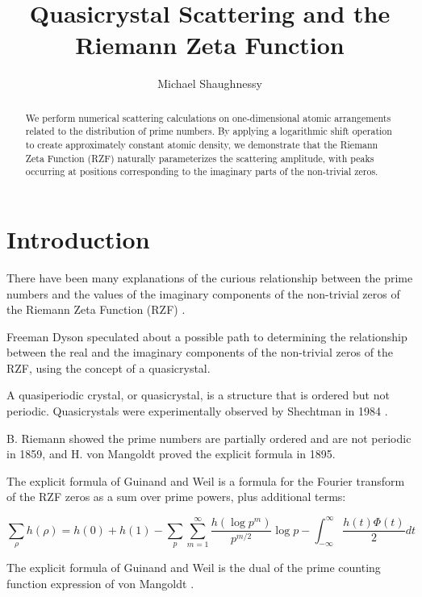 \documentclass[11pt, oneside]{article}
\title{Quasicrystal Scattering and the Riemann Zeta Function}
\author{Michael Shaughnessy}
\begin{document}
\maketitle

\begin{abstract}
We perform numerical scattering calculations on one-dimensional atomic arrangements related to the distribution of prime numbers. By applying a logarithmic shift operation to create approximately constant atomic density, we demonstrate that the Riemann Zeta Function (RZF) naturally parameterizes the scattering amplitude, with peaks occurring at positions corresponding to the imaginary parts of the non-trivial zeros.
\end{abstract}

\section{Introduction}

There have been many explanations of the curious relationship between the prime numbers and the values of the imaginary components of the non-trivial zeros of the Riemann Zeta Function (RZF) \cite{Riemann1859, Selberg1956, Dyson2009, Zhang2014}.

Freeman Dyson \cite{Baez2013} speculated about a possible path to determining the relationship between the real and the imaginary components of the non-trivial zeros of the RZF, using the concept of a quasicrystal.

A quasiperiodic crystal, or quasicrystal, is a structure that is ordered but not periodic. Quasicrystals were experimentally observed by Shechtman in 1984 \cite{Shectman1984}. 

B. Riemann showed the prime numbers are partially ordered and are not periodic \cite{Riemann1859} in 1859, and H. von Mangoldt \cite{VonMangoldt1895} proved the explicit formula in 1895.

The explicit formula of Guinand and Weil \cite{Weil} is a formula for the Fourier transform of the RZF zeros as a sum over prime powers, plus additional terms:

\begin{equation}
\sum_{\rho} h(\rho) = h(0) + h(1) - \sum_{p} \sum_{m=1}^{\infty} \frac{h(\log p^m)}{p^{m/2}} \log p - \int_{-\infty}^{\infty} \frac{h(t) \Phi(t)}{2} dt
\end{equation}

The explicit formula of Guinand and Weil is the dual of the prime counting function expression of von Mangoldt \cite{VonMangoldt1895}.
\end{document}
